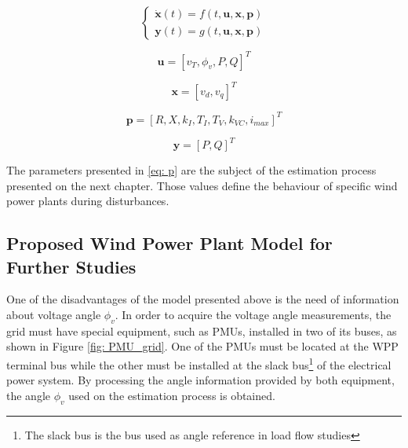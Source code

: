 \begin{equation}
	\begin{cases}
		\dot{\mathbf{x}}(t) = f(t, \mathbf{u}, \mathbf{x}, \mathbf{p}) \\
		\mathbf{y}(t) = g(t, \mathbf{u}, \mathbf{x}, \mathbf{p})
	\end{cases}
	\label{eq: xdot}
\end{equation}

\begin{equation}
	\mathbf{u} = [v_{T}, \phi_{v}, P, Q]^T
	\label{eq: u}
\end{equation}

\begin{equation}
	\mathbf{x} = [v_{d}, v_{q}]^T
	\label{eq: x}
\end{equation}

\begin{equation}
	\mathbf{p} = [R, X, k_{I}, T_{I}, T_{V}, k_{VC}, i_{max}]^T
	\label{eq: p}
\end{equation}

\begin{equation}
	\mathbf{y} = [P, Q]^T
	\label{eq: y}
\end{equation}

The parameters presented in \eqref{eq: p} are the subject of the estimation process presented on the next chapter. Those values define the behaviour of specific wind power plants during disturbances.

\subsection{Proposed Wind Power Plant Model for Further Studies}
\label{ssec: proposed_model}

One of the disadvantages of the model presented above is the need of information about voltage angle $\phi_{v}$. In order to acquire the voltage angle measurements, the grid must have special equipment, such as PMUs, installed in two of its buses, as shown in Figure \ref{fig: PMU_grid}. One of the PMUs must be located at the WPP terminal bus while the other must be installed at the slack bus\footnote{The slack bus is the bus used as angle reference in load flow studies} of the electrical power system. By processing the angle information provided by both equipment, the angle $\phi_{v}$ used on the estimation process is obtained.

